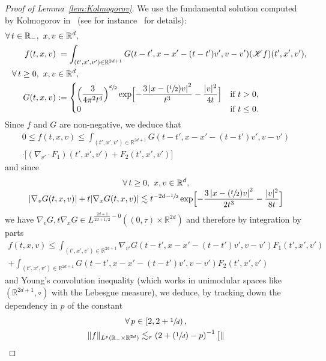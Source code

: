 \documentclass[10pt]{amsart}
\let\mathcal\mathscr
\newcommand{\Psfrac}[2]{(\sfrac{#1}{#2})}
\theoremstyle{definition}
\theoremstyle{remark}
\newcommand\R{{\mathbb R}}
\newcommand{\cK}{\mathcal K}
\begin{document}
\begin{proof}[Proof of Lemma~\ref{lem:Kolmogorov}]
We use the fundamental solution computed by Kolmogorov
in~\cite{kolmogorov} (see for
instance~\cite[App.\,A]{MR4113786} for details):
\begin{align*}
\forall \, t \in \R_-, \ x,v &\in \R^d, \\
f(t,x,v) &\phantom{:}=\int_{(t',x',v')\in \R^{2d+1}} G(t-t', x-x'
-(t-t')v',v-v') (\cK f)(t',x',v'), \\
\forall \, t \ge 0, \ x,v &\in \R^d, \\
G(t,x,v) &:=
\begin{dcases}
\Bigl( \frac{3}{4\pi^2 t^4} \Bigr)^{\sfrac{d}{2}}
\exp \Bigl[ - \frac{3 \left| x - \Psfrac{t}{2} v
\right|^2}{t^3} - \frac{|v|^2}{4t} \Bigr] & \text{if } t>0,\\
0 & \text{if } t\leq 0.
\end{dcases}
\end{align*}
Since $f$ and $G$ are non-negative, we deduce that
\begin{multline*}
0 \le f(t,x,v) \le\int_{(t',x',v')\in \R^{2d+1}} G(t-t', x-x'-(t-t')v',v-v')\\
\cdot\bigl[(\nabla_{v'} \cdot F_1) (t',x',v')+ F_2 (t',x',v') \bigr]
\end{multline*}
and since
\begin{multline*}
\forall \, t \ge 0, \ x,v \in \R^d, \\[-5pt]
|\nabla_v G(t,x,v)| +t |\nabla_x G(t,x,v)|
\lesssim t^{-2d-\sfrac12}
\exp \Bigl[ - \frac{3 \left| x - \Psfrac{t}{2} v
\right|^2}{2t^3} - \frac{|v|^2}{8t} \Bigr]
\end{multline*}
we have
$\nabla_v G, t \nabla_x G \in L^{\frac{2d+1}{2d+1/2}-0}
(\left(0,\tau\right) \times \R^{2d})$ and therefore by
integration by parts
\begin{multline*}
f(t,x,v) \le \int_{(t',x',v')\in \R^{2d+1}}
\nabla_{v'} G(t-t',x-x'-(t-t')v',v-v') F_1(t',x',v')\\
+ \int_{(t',x',v') \in \R^{2d+1}}
G(t-t',x-x'-(t-t')v',v-v') F_2(t',x',v')
\end{multline*}
and Young's convolution inequality (which works in unimodular
spaces like $(\R^{2d+1},\circ)$ with the Lebesgue measure), we
deduce, by tracking down the dependency in $p$ of the constant
\begin{multline*}
\forall \, p \in \left[2,2+\sfrac1d\right), \\
\| f \|_{L^{p}(\R_- \times \R^{2d})}\lesssim_\tau \left( 2+ \Psfrac1d - p \right)^{-1} \bigl[ \|

\end{multline*}
\end{proof}
\end{document}
